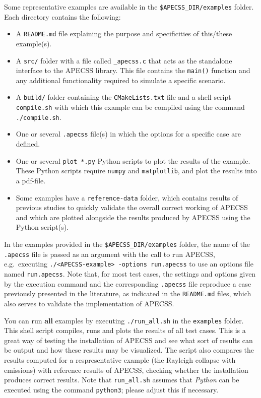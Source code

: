 Some representative examples are available in the {\tt \$APECSS\_DIR/examples} folder. Each directory contains the following:\vspace{-1em}
\begin{itemize}[noitemsep]
  \item A {\tt README.md} file explaining the purpose and specificities of this/these example(s).
  \item A {\tt src/} folder with a file called {\tt *\_apecss.c} that acts as the standalone interface to the APECSS library. This file contains the {\tt main()} function and any additional functionality required to simulate a specific scenario.
  \item A {\tt build/} folder containing the {\tt CMakeLists.txt} file and a shell script {\tt compile.sh} with which this example can be compiled using the command {\tt ./compile.sh}.
  \item One or several {\tt *.apecss} file(s) in which the options for a specific case are defined.
  \item One or several {\tt plot\_*.py} Python scripts to plot the results of the example. These Python scripts require {\tt numpy} and {\tt matplotlib}, and plot the results into a pdf-file. 
  \item Some examples have a {\tt reference-data} folder, which contains results of previous studies to quickly validate the overall correct working of APECSS and which are plotted alongside the results produced by APECSS using the Python script(s).
\end{itemize}

In the examples provided in the {\tt \$APECSS\_DIR/examples} folder, the name of the  {\tt *.apecss} file is passed as an argument with the call to run APECSS, e.g.~executing {\tt ./<APECSS-example> -options run.apecss} to use an options file named {\tt run.apecss}. Note that, for most test cases, the settings and options given by the execution command and the corresponding {\tt *.apecss} file reproduce a case previously presented in the literature, as indicated in the {\tt README.md} files, which also serves to validate the implementation of APECSS.

You can run \textbf{all} examples by executing {\tt ./run\_all.sh} in the {\tt examples} folder. This shell script compiles, runs and plots the results of all test cases. This is a great way of testing the installation of APECSS and see what sort of results can be output and how these results may be visualized. The script also compares the results computed for a respresentative example (the Rayleigh collapse with emissions) with reference results of APECSS, checking whether the installation produces correct results. Note that {\tt run\_all.sh} assumes that \textit{Python} can be executed using the command {\tt python3}; please adjust this if necessary.

